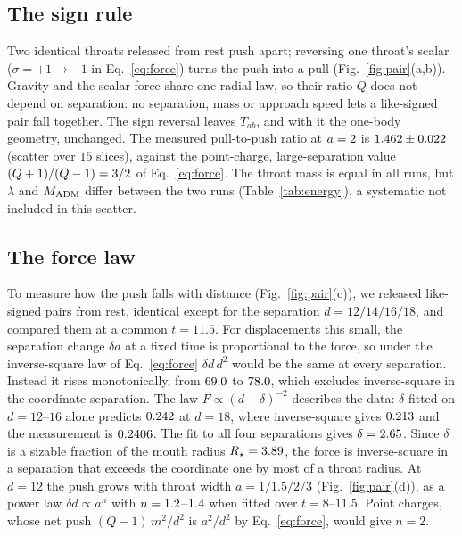 \documentclass[twocolumn,floatfix,aps,prd,superscriptaddress,nofootinbib]{revtex4-2}
\begin{document}
\subsection{The sign rule}
\label{sec:pair:sign}

Two identical throats released from rest push apart; reversing one throat's scalar ($\sigma=+1\to-1$ in Eq.~\eqref{eq:force}) turns the push into a pull (Fig.~\ref{fig:pair}(a,b)). Gravity and the scalar force share one radial law, so their ratio $Q$ does not depend on separation: no separation, mass or approach speed lets a like-signed pair fall together. The sign reversal leaves $T_{ab}$, and with it the one-body geometry, unchanged. The measured pull-to-push ratio at $a=2$ is $1.462\pm0.022$ (scatter over $15$ slices), against the point-charge, large-separation value $(Q+1)/(Q-1)=3/2$ of Eq.~\eqref{eq:force}. The throat mass is equal in all runs, but $\lambda$ and $M_{\rm ADM}$ differ between the two runs (Table~\ref{tab:energy}), a systematic not included in this scatter.

\subsection{The force law}
\label{sec:pair:force}

To measure how the push falls with distance (Fig.~\ref{fig:pair}(c)), we released \clmCountLikeSignedPairs{} like-signed pairs from rest, identical except for the separation $d=12/14/16/18$, and compared them at a common $t=11.5$. For displacements this small, the separation change $\delta d$ at a fixed time is proportional to the force, so under the inverse-square law of Eq.~\eqref{eq:force} $\delta d\,d^2$ would be the same at every separation. Instead it rises monotonically, from $69.0$ to $78.0$, which excludes inverse-square in the coordinate separation. The law $F\propto(d+\delta)^{-2}$ describes the data: $\delta$ fitted on $d=12$--$16$ alone predicts $0.242$ at $d=18$, where inverse-square gives $0.213$ and the measurement is $0.2406$. The fit to all four separations gives $\delta=2.65$. Since $\delta$ is a sizable fraction of the mouth radius $R_\star=3.89$, the force is inverse-square in a separation that exceeds the coordinate one by most of a throat radius. At $d=12$ the push grows with throat width $a=1/1.5/2/3$ (Fig.~\ref{fig:pair}(d)), as a power law $\delta d\propto a^n$ with $n=1.2$--$1.4$ when fitted over $t=8$--$11.5$. Point charges, whose net push $(Q-1)\,m^2/d^2$ is $a^2/d^2$ by Eq.~\eqref{eq:force}, would give $n=2$.
\end{document}
